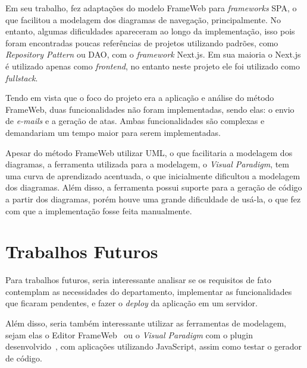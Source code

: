 Em seu trabalho,  fez adaptações do modelo FrameWeb para \textit{frameworks} SPA, o que facilitou 
a modelagem dos diagramas de navegação, principalmente. No entanto, algumas dificuldades apareceram ao longo da implementação,
isso pois foram encontradas poucas referências de projetos utilizando padrões, como \textit{Repository Pattern} ou DAO, com o \textit{framework} Next.js.
Em sua maioria o Next.js é utilizado apenas como \textit{frontend}, no entanto neste projeto ele foi utilizado como \textit{fullstack}.


Tendo em vista que o foco do projeto era a aplicação e análise do método FrameWeb, duas funcionalidades não foram implementadas,
sendo elas: o envio de \textit{e-mails} e a geração de atas. Ambas funcionalidades são complexas e demandariam um tempo maior para serem implementadas.


Apesar do método FrameWeb utilizar UML, o que facilitaria a modelagem dos diagramas, a ferramenta utilizada para a modelagem, o \textit{Visual Paradigm}, 
tem uma curva de aprendizado acentuada, o que inicialmente dificultou a modelagem dos diagramas. Além disso, a ferramenta possui suporte para a geração de código
a partir dos diagramas, porém houve uma grande dificuldade de usá-la, o que fez com que a implementação fosse feita manualmente.


\section{Trabalhos Futuros}
\label{sec-conclusoes-trabalhosfuturos}


Para trabalhos futuros, seria interessante analisar se os requisitos de fato contemplam as necessidades do departamento,
implementar as funcionalidades que ficaram pendentes, e fazer o \textit{deploy} da aplicação em um servidor.

Além disso, seria também interessante utilizar as ferramentas de modelagem, sejam elas o Editor FrameWeb~\cite{campos:2017} ou o \textit{Visual Paradigm} com o plugin desenvolvido~\cite{silva:2023},
com aplicações utilizando JavaScript, assim como testar o gerador de código.

